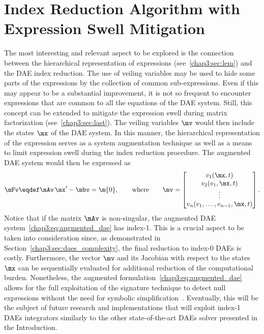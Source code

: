 \section{Index Reduction Algorithm with Expression Swell Mitigation}

The most interesting and relevant aspect to be explored is the connection between the hierarchical representation of expressions (see~\ref{chap3:sec:lem}) and the \ac{DAE} index reduction. The use of veiling variables may be used to hide some parts of the expressions by the collection of common sub-expressions. Even if this may appear to be a substantial improvement, it is not so frequent to encounter expressions that are common to all the equations of the \ac{DAE} system. Still, this concept can be extended to mitigate the expression swell during matrix factorization (see~\ref{chap3:sec:last}). The veiling variables $\mv$ would then include the states $\mx$ of the \ac{DAE} system. In this manner, the hierarchical representation of the expression serves as a system augmentation technique as well as a means to limit expression swell during the index reduction procedure. The augmented \ac{DAE} system would then be expressed as
%
\begin{equation}
  \label{chap3:eq:augmented_dae}
  \mFv \eqdef \mAv \, \mx^\prime - \mbv = \m{0},
  \qquad \text{where} \qquad
  \mv = \begin{bmatrix}
    v_{1}(\mx, t) \\
    v_{2}(v_{1}, \mx, t) \\
    \vdots \\
    v_{n}(v_{1}, \dots, v_{n-1}, \mx, t) \\
  \end{bmatrix}.
\end{equation}
%
Notice that if the matrix $\mAv$ is non-singular, the augmented \ac{DAE} system~\eqref{chap3:eq:augmented_dae} has index-1. This is a crucial aspect to be taken into consideration since, as demonstrated in Section~\ref{chap3:sec:daes_complexity}, the final reduction to index-0 \acp{DAE} is costly. Furthermore, the vector $\mv$ and its Jacobian with respect to the states $\mx$ can be sequentially evaluated for additional reduction of the computational burden. Nonetheless, the augmented formulation~\eqref{chap3:eq:augmented_dae} allows for the full exploitation of the signature technique to detect null expressions without the need for symbolic simplification~\cite{monagan1994signature}. Eventually, this will be the subject of future research and implementations that will exploit index-1 \acp{DAE} integrators similarly to the other state-of-the-art \acp{DAE} solver presented in the Introduction.


